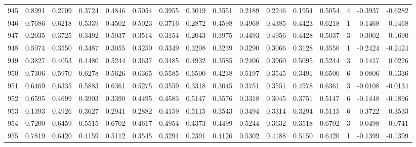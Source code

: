 \begin{tabular}{lrrrrrrrrrrrrrrr}
945 &      0.8991 &  0.2709 &  0.3724 &  0.4846 &  0.5054 &  0.3955 &  0.3019 &  0.3551 &  0.2189 &  0.2246 &   0.1954 &     0.5054 &      4 &                   -0.3937 &                    -0.6282 \\
946 &      0.7686 &  0.6218 &  0.5339 &  0.4502 &  0.5023 &  0.3716 &  0.2872 &  0.4598 &  0.4968 &  0.4385 &   0.4423 &     0.6218 &      1 &                   -0.1468 &                    -0.1468 \\
947 &      0.2035 &  0.3725 &  0.3492 &  0.5037 &  0.3514 &  0.3154 &  0.2043 &  0.3975 &  0.4493 &  0.4956 &   0.4428 &     0.5037 &      3 &                    0.3002 &                     0.1690 \\
948 &      0.5974 &  0.3550 &  0.3487 &  0.3055 &  0.3250 &  0.3349 &  0.3208 &  0.3239 &  0.3290 &  0.3066 &   0.3128 &     0.3550 &      1 &                   -0.2424 &                    -0.2424 \\
949 &      0.3827 &  0.4053 &  0.4480 &  0.5244 &  0.3637 &  0.3485 &  0.4932 &  0.3585 &  0.2406 &  0.3960 &   0.5095 &     0.5244 &      3 &                    0.1417 &                     0.0226 \\
950 &      0.7306 &  0.5970 &  0.6278 &  0.5626 &  0.6365 &  0.5585 &  0.6500 &  0.4238 &  0.5197 &  0.3545 &   0.3491 &     0.6500 &      6 &                   -0.0806 &                    -0.1336 \\
951 &      0.6469 &  0.6335 &  0.5883 &  0.6361 &  0.5275 &  0.3559 &  0.3318 &  0.3045 &  0.3751 &  0.3551 &   0.4978 &     0.6361 &      3 &                   -0.0108 &                    -0.0134 \\
952 &      0.6595 &  0.4699 &  0.3903 &  0.3390 &  0.4495 &  0.4583 &  0.5147 &  0.3576 &  0.3318 &  0.3045 &   0.3751 &     0.5147 &      6 &                   -0.1448 &                    -0.1896 \\
953 &      0.1393 &  0.4926 &  0.3627 &  0.2941 &  0.2882 &  0.4159 &  0.5115 &  0.3543 &  0.3494 &  0.3314 &   0.3294 &     0.5115 &      6 &                    0.3722 &                     0.3533 \\
954 &      0.7200 &  0.6459 &  0.5515 &  0.6702 &  0.4617 &  0.4954 &  0.4373 &  0.4499 &  0.5244 &  0.3632 &   0.3518 &     0.6702 &      3 &                   -0.0498 &                    -0.0741 \\
955 &      0.7819 &  0.6420 &  0.4159 &  0.5112 &  0.3545 &  0.3291 &  0.2391 &  0.4126 &  0.5302 &  0.4188 &   0.5150 &     0.6420 &      1 &                   -0.1399 &                    -0.1399 \\

\end{tabular}
